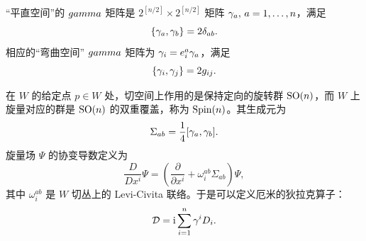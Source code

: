 
“平直空间”的 $\\gamma$ 矩阵是 $2^{[n/2]}\times 2^{[n/2]}$ 矩阵 ${\gamma}_a, \,a=1,\dots,n$，满足
\begin{equation}\label{worth}\{{\gamma}_a,{\gamma}_b\}=2\delta_{ab}.\end{equation}
相应的“弯曲空间” $\\gamma$ 矩阵为 ${\gamma}_i=e_i^a{\gamma}_a$，满足
\begin{equation}\label{zorth}\{{\gamma}_i,{\gamma}_j\}=2g_{ij}.\end{equation}


在 $W$ 的给定点 $p\in W$ 处，切空间上作用的是保持定向的旋转群 ${\mathrm{SO}}(n)$，而 $W$ 上旋量对应的群是 ${\mathrm{SO}}(n)$ 的双重覆盖，称为 ${\mathrm{Spin}}(n)$。其生成元为
\begin{equation}\label{torth}\Sigma_{ab}=\frac{1}{4}[{\gamma}_a,{\gamma}_b]. \end{equation}
旋量场 $\Psi$ 的协变导数定义为
\begin{equation}\label{porth}\frac{D}{D x^i}\Psi=\left(\frac{\partial}{\partial x^i}+\omega_i^{ab}\Sigma_{ab}\right)\Psi,\end{equation}
其中 $\omega_i^{ab}$ 是 $W$ 切丛上的 Levi-Civita 联络。于是可以定义厄米的狄拉克算子：
\begin{equation}\label{dirac}{\mathcal D}={\mathrm i}\sum_{i=1}^n{\gamma}^iD_i. \end{equation}


